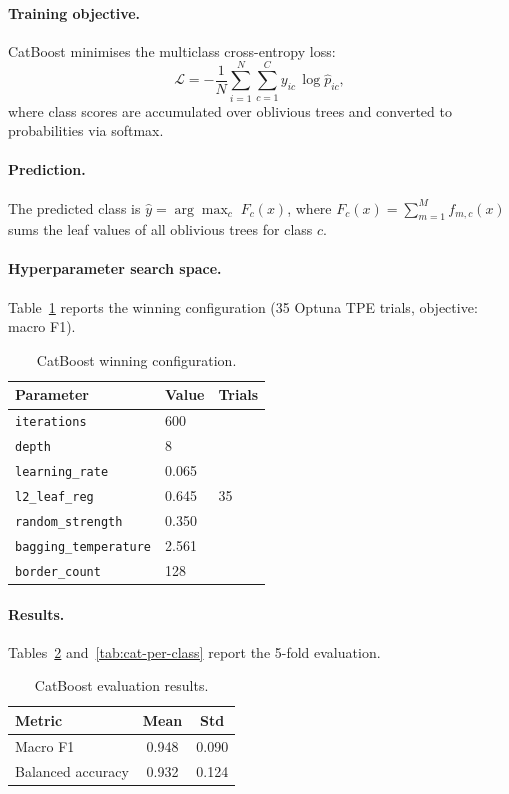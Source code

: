 \paragraph{Training objective.}
CatBoost minimises the multiclass cross-entropy loss:
\begin{equation}
    \mathcal{L} = -\frac{1}{N}\sum_{i=1}^{N}\sum_{c=1}^{C} y_{ic}\,\log\hat{p}_{ic},
\end{equation}
where class scores are accumulated over oblivious trees and converted to probabilities via softmax.

\paragraph{Prediction.}
The predicted class is $\hat{y} = \arg\max_{c}\; F_c(x)$, where $F_c(x) = \sum_{m=1}^{M} f_{m,c}(x)$ sums the leaf values of all oblivious trees for class $c$.

\paragraph{Hyperparameter search space.}
Table~\ref{tab:cat-hpo} reports the winning configuration (35 Optuna TPE trials, objective: macro F1).
\begin{table}[H]
\centering
\caption{CatBoost winning configuration.\label{tab:cat-hpo}}
\begin{tabular}{lll}
\toprule
\textbf{Parameter} & \textbf{Value} & \textbf{Trials} \\
\midrule
\texttt{iterations}           & 600   & \multirow{7}{*}{35} \\
\texttt{depth}                & 8     & \\
\texttt{learning\_rate}       & 0.065 & \\
\texttt{l2\_leaf\_reg}        & 0.645 & \\
\texttt{random\_strength}     & 0.350 & \\
\texttt{bagging\_temperature} & 2.561 & \\
\texttt{border\_count}        & 128   & \\
\bottomrule
\end{tabular}
\end{table}

\paragraph{Results.}
Tables~\ref{tab:cat-results} and~\ref{tab:cat-per-class} report the 5-fold evaluation.
\begin{table}[H]
\centering
\caption{CatBoost evaluation results.\label{tab:cat-results}}
\begin{tabular}{lcc}
\toprule
\textbf{Metric} & \textbf{Mean} & \textbf{Std} \\
\midrule
Macro F1          & 0.948 & 0.090 \\
Balanced accuracy & 0.932 & 0.124 \\
\bottomrule
\end{tabular}
\end{table}


